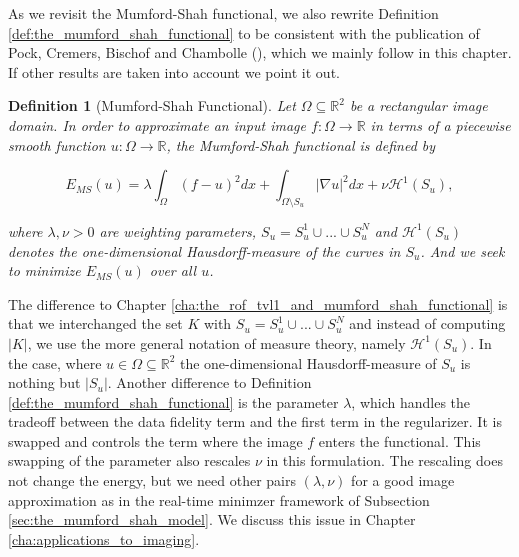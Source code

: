 \documentclass[abstracton]{scrreprt}
\newtheorem{definition}[theorem]{Definition}
\begin{document}
    As we revisit the Mumford-Shah functional, we also rewrite Definition \ref{def:the_mumford_shah_functional} to be consistent with the publication of Pock, Cremers, Bischof and Chambolle (\cite{Pock-et-al-iccv09}), which we mainly follow in this chapter. If other results are taken into account we point it out.
    \begin{definition}[Mumford-Shah Functional] %
    \label{def:the_mumford_shah_functional_revisited}
        Let $\Omega \subseteq \mathbb{R}^{2}$ be a rectangular image domain. In order to approximate an input image $f: \Omega \longrightarrow \mathbb{R}$ in terms of a piecewise smooth function $u: \Omega \longrightarrow \mathbb{R}$, the Mumford-Shah functional is defined by
            
            \begin{equation}
                E_{MS}(u) = \lambda \int_{\Omega} (f - u)^{2} dx + \int_{\Omega \setminus S_{u}} |\nabla u|^{2} dx + \nu \mathcal{H}^{1}(S_{u}),
            \label{eq:the_mumford_shah_functional_revisited}
            \end{equation}
        
        where $\lambda, \nu > 0$ are weighting parameters, $S_{u} = S^{1}_{u} \cup ... \cup S^{N}_{u}$ and $\mathcal{H}^{1}(S_{u})$ denotes the one-dimensional Hausdorff-measure of the curves in $S_{u}$. And we seek to minimize $E_{MS}(u)$ over all $u$.
    \end{definition}
    The difference to Chapter \ref{cha:the_rof_tvl1_and_mumford_shah_functional} is that we interchanged the set $K$ with $S_{u} = S^{1}_{u} \cup ... \cup S^{N}_{u}$ and instead of computing $|K|$, we use the more general notation of measure theory, namely $\mathcal{H}^{1}(S_{u})$. In the case, where $u \in \Omega \subseteq \mathbb{R}^{2}$ the one-dimensional Hausdorff-measure of $S_{u}$ is nothing but $|S_{u}|$. Another difference to Definition \ref{def:the_mumford_shah_functional} is the parameter $\lambda$, which handles the tradeoff between the data fidelity term and the first term in the regularizer. It is swapped and controls the term where the image $f$ enters the functional. This swapping of the parameter also rescales $\nu$ in this formulation. The rescaling does not change the energy, but we need other pairs $(\lambda, \nu)$ for a good image approximation as in the real-time minimzer framework of Subsection \ref{sec:the_mumford_shah_model}. We discuss this issue in Chapter \ref{cha:applications_to_imaging}.\\
\end{document}
